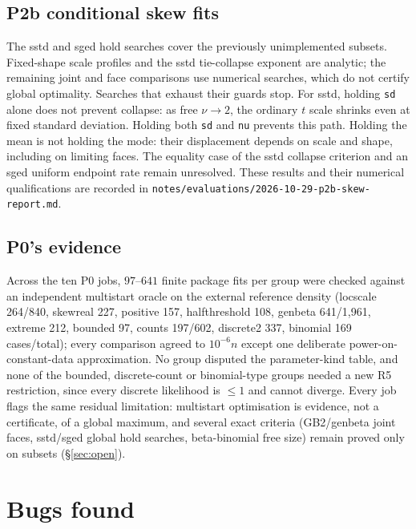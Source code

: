 \documentclass[11pt]{article}
\newcommand{\code}[1]{\texttt{#1}}
\theoremstyle{plain}
\theoremstyle{definition}
\theoremstyle{remark}
\begin{document}
\subsection*{P2b conditional skew fits}

The sstd and sged hold searches cover the previously unimplemented subsets.
Fixed-shape scale profiles and the sstd tie-collapse exponent are analytic;
the remaining joint and face comparisons use numerical searches, which do
not certify global optimality. Searches that exhaust their guards stop.
For sstd, holding \code{sd} alone does not prevent collapse: as free
$\nu\to2$, the ordinary $t$ scale shrinks even at fixed standard deviation.
Holding both \code{sd} and \code{nu} prevents this path. Holding the mean
is not holding the mode: their displacement depends on scale and shape,
including on limiting faces. The equality case of the sstd collapse criterion
and an sged uniform endpoint rate remain unresolved. These results and their
numerical qualifications are recorded in \code{notes/evaluations/2026-10-29-p2b-skew-report.md}.

\subsection*{P0's evidence}

Across the ten P0 jobs, $97$--$641$ finite package fits per group were
checked against an independent multistart oracle on the external reference
density (locscale 264/840, skewreal 227, positive 157, halfthreshold 108,
genbeta 641/1{,}961, extreme 212, bounded 97, counts 197/602, discrete2 337,
binomial 169 cases/total); every comparison agreed to $10^{-6}n$ except one
deliberate power-on-constant-data approximation. No group disputed the
parameter-kind table, and none of the bounded, discrete-count or
binomial-type groups needed a new R5 restriction, since every discrete
likelihood is $\le1$ and cannot diverge. Every job flags the same residual
limitation: multistart optimisation is evidence, not a certificate, of a
global maximum, and several exact criteria (GB2/genbeta joint faces,
sstd/sged global hold searches, beta-binomial free size) remain proved only
on subsets (\S\ref{sec:open}).

\section{Bugs found}\label{sec:bugs}
\end{document}

